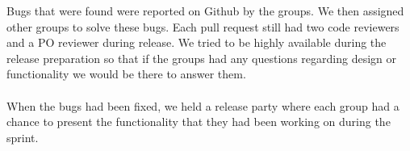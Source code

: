 Bugs that were found were reported on Github by the groups. 
We then assigned other groups to solve these bugs.
Each pull request still had two code reviewers and a PO reviewer during release. 
We tried to be highly available during the release preparation so that if the groups had any questions regarding design or functionality we would be there to answer them.
\\\\
When the bugs had been fixed, we held a release party where each group had a chance to present the functionality that they had been working on during the sprint. 
